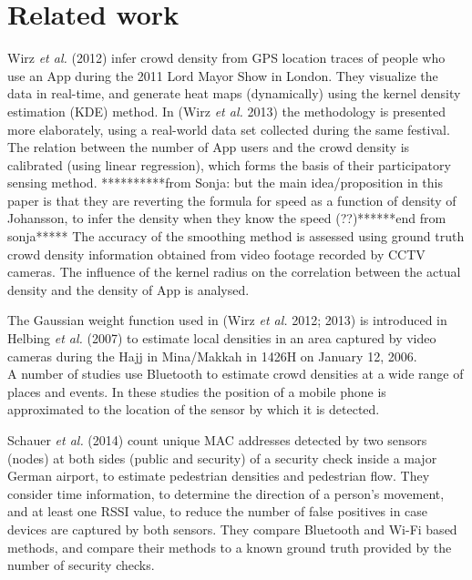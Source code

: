 \documentclass[10pt,a4paper]{article}
\begin{document}
\section{Related work}

Wirz \textit{et al.} (2012) \cite{wirz:1} infer crowd density from GPS location traces of people who use an App during the 2011 Lord Mayor Show in London. They visualize the data in real-time, and generate heat maps (dynamically) using the kernel density estimation (KDE) method. In (Wirz \textit{et al.} 2013) \cite{wirz:2} the methodology is presented more elaborately, using a real-world data set collected during the same festival. The relation between the number of App users and the crowd density is calibrated (using linear regression), which forms the basis of their participatory sensing method. **********from Sonja: but the main idea/proposition in this paper is that they are reverting the formula for speed as a function of density of Johansson, to infer the density when they know the speed (??)******end from sonja*****
The accuracy of the smoothing method is assessed using ground truth crowd density information obtained from video footage recorded by CCTV cameras. 
The influence of the kernel radius on the correlation between the actual density and the density of App is analysed.

The Gaussian weight function used in (Wirz \textit{et al.} 2012; 2013) \cite{wirz:1}\cite{wirz:2} is introduced in Helbing \textit{et al.} (2007) \cite{helbing:1} to estimate local densities in an area captured by video cameras during the Hajj in Mina/Makkah in 1426H on January 12, 2006.\\

A number of studies use Bluetooth to estimate crowd densities at a wide range of places and events.
In these studies the position of a mobile phone is approximated to the location of the sensor by which it is detected.

Schauer \textit{et al.} (2014) \cite{schauer:1} count unique MAC addresses detected by two sensors (nodes) at both sides (public and security) of a security check inside a major German airport, to estimate pedestrian densities and pedestrian flow. They consider time information, to determine the direction of a person's movement, and at least one RSSI value, to reduce the number of false positives in case devices are captured by both sensors. They compare Bluetooth and Wi-Fi based methods, and compare their methods to a known ground truth provided by the number of security checks.
\end{document}
